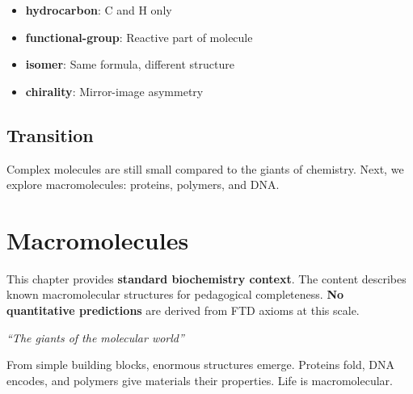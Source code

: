 \documentclass[
  11pt,
  letterpaper,
  twoside,
  openright]{book}
\providecommand{\tightlist}{%
  \setlength{\itemsep}{0pt}\setlength{\parskip}{0pt}}
\begin{document}
\begin{itemize}
\tightlist
\item
  \textbf{hydrocarbon}: C and H only
\item
  \textbf{functional-group}: Reactive part of molecule
\item
  \textbf{isomer}: Same formula, different structure
\item
  \textbf{chirality}: Mirror-image asymmetry
\end{itemize}

\section{Transition}\label{transition-6}

Complex molecules are still small compared to the giants of chemistry.
Next, we explore macromolecules: proteins, polymers, and DNA.

\chapter{Macromolecules}\label{sec-macromolecules}

\begin{tcolorbox}[enhanced jigsaw, leftrule=.75mm, title=\textcolor{quarto-callout-warning-color}{\faExclamationTriangle}\hspace{0.5em}{Pedagogical Context {[}NOT DERIVED FROM FTD{]}}, bottomrule=.15mm, opacityback=0, coltitle=black, arc=.35mm, colframe=quarto-callout-warning-color-frame, colbacktitle=quarto-callout-warning-color!10!white, colback=white, titlerule=0mm, breakable, bottomtitle=1mm, toptitle=1mm, rightrule=.15mm, toprule=.15mm, left=2mm, opacitybacktitle=0.6]

This chapter provides \textbf{standard biochemistry context}. The
content describes known macromolecular structures for pedagogical
completeness. \textbf{No quantitative predictions} are derived from FTD
axioms at this scale.

\end{tcolorbox}

\emph{``The giants of the molecular world''}

\begin{tcolorbox}[enhanced jigsaw, leftrule=.75mm, title=\textcolor{quarto-callout-note-color}{\faInfo}\hspace{0.5em}{Key Revelation}, bottomrule=.15mm, opacityback=0, coltitle=black, arc=.35mm, colframe=quarto-callout-note-color-frame, colbacktitle=quarto-callout-note-color!10!white, colback=white, titlerule=0mm, breakable, bottomtitle=1mm, toptitle=1mm, rightrule=.15mm, toprule=.15mm, left=2mm, opacitybacktitle=0.6]

From simple building blocks, enormous structures emerge. Proteins fold,
DNA encodes, and polymers give materials their properties. Life is
macromolecular.

\end{tcolorbox}
\end{document}
